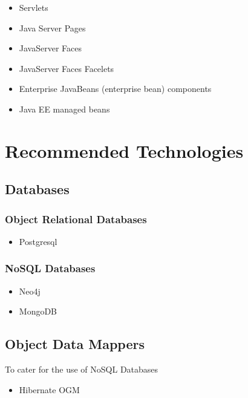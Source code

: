 \begin{itemize}
	\item Servlets
\end{itemize}

\begin{itemize}
	\item Java Server Pages
\end{itemize}


\begin{itemize}
	\item JavaServer Faces
\end{itemize}

\begin{itemize}
	\item JavaServer Faces Facelets
\end{itemize}

\begin{itemize}
	\item Enterprise JavaBeans (enterprise bean) components
\end{itemize}

\begin{itemize}
	\item Java EE managed beans
\end{itemize}


\section{Recommended Technologies}
\subsection{Databases}
\subsubsection{Object Relational Databases}
\begin{itemize}
	\item Postgresql
\end{itemize}

\subsubsection{NoSQL Databases}
\begin{itemize}
	\item Neo4j
	\item MongoDB
\end{itemize}

\subsection{Object Data Mappers}
To cater for the use of NoSQL Databases
\begin{itemize}
	\item Hibernate OGM
\end{itemize}
